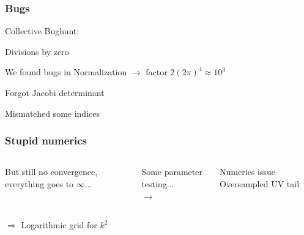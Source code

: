 \begin{frame}\frametitle{Bugs}
  {\Large Collective Bughunt:}


  {\small

    \pause
    \vspace{3mm}
    Divisions by zero

    \pause
    \vspace{3mm}
    We found bugs in Normalization $\rightarrow$ factor $2(2\pi)^4 \approx 10^3$

    \pause
    \vspace{3mm}
    Forgot Jacobi determinant

    \pause
    \vspace{3mm}
    Mismatched some indices
  }
\end{frame}

\begin{frame}\frametitle{Stupid numerics}
  \begin{columns}
    \centering
    \begin{column}{0.4\linewidth}
      \begin{block}{}
        \vspace{-0.cm}
        But still no convergence, everything goes to $\infty$...
      \end{block}
    \end{column}
    \pause
    \begin{column}{0.2\linewidth}
      \centering
      {\tiny
        Some parameter testing...\\
      }
      $\rightarrow$
    \end{column}
    \pause
    \begin{column}{0.4\linewidth}
      \begin{block}{Numerics issue}
        \vspace{-0.cm}
          Oversampled UV tail
      \end{block}
    \end{column}
  \end{columns}
  \pause
  \vspace{1cm}
  \centering
  $\Rightarrow$ Logarithmic grid for $k^2$
\end{frame}

